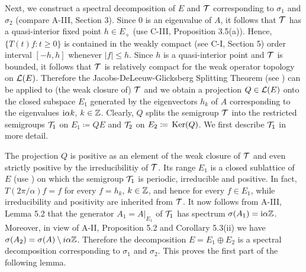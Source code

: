 Next, we construct a spectral decomposition of $E$ and $\mathcal{T}$ corresponding to $\sigma_{1}$ and $\sigma_{2}$ (compare A-III, Section 3).
Since $0$ is an eigenvalue of $A$, it follows that $\mathcal{T}$ has a quasi-interior fixed point $h \in E_{+}$ (use C-III, Proposition 3.5(a)).
Hence, $\{T(t)f : t \geq 0\}$ is contained in the weakly compact (see C-I, Section 5) order interval $[-h,h]$ whenever $|f| \leq h$.
Since $h$ is a quasi-interior point and $\mathcal{T}$ is bounded, it follows that $\mathcal{T}$ is relatively compact for the weak operator topology on $\mathcal{L}(E)$.
Therefore the Jacobs-DeLeeuw-Glicksberg Splitting Theorem (see \citet[Chapter 2, Theorem 4.4 and 4.5]{krengel:1985}) can be applied to (the weak closure of) $\mathcal{T}$ and we obtain a projection $Q \in \mathcal{L}(E)$ onto the closed subspace $E_{1}$ generated by the eigenvectors $h_{k}$ of $A$ corresponding to the eigenvalues $\mathrm{i}\alpha k$, $k \in \mathbb{Z}$.
Clearly, $Q$ splits the semigroup $\mathcal{T}$ into the restricted semigroups $\mathcal{T}_{1}$ on $E_{1} \coloneqq QE$ and $\mathcal{T}_{2}$ on $E_{2} \coloneqq \mathop{}\mathrm{Ker}(Q)$.
We first describe $\mathcal{T}_{1}$ in more detail.

The projection $Q$ is positive as an element of the weak closure of $\mathcal{T}$ and even strictly positive by the irreducibilitiy of $\mathcal{T}$.
Its range $E_{1}$ is a closed sublattice of $E$ (use \citet[Proposition III.11.5]{schaefer:1974}) on which the semigroup $\mathcal{T}_{1}$ is periodic, irreducible and positive.
In fact, $T(2\pi/\alpha)f = f$ for every $f = h_{k}$, $k \in \mathbb{Z}$, and hence for every $f \in E_{1}$, while irreducibility and positivity are inherited from $\mathcal{T}$.
It now follows from A-III, Lemma 5.2 that the generator $A_{1} = A|_{E_{1}}$ of $\mathcal{T}_{1}$ has spectrum $\sigma(A_{1}) = \mathrm{i}\alpha\mathbb{Z}$.
Moreover, in view of A-II, Proposition 5.2 and Corollary 5.3(ii) 
we have $\sigma(A_{2}) = \sigma(A) \setminus i\alpha\mathbb{Z}$.
Therefore the decomposition $E = E_{1} \oplus E_{2}$ is a spectral decomposition corresponding to $\sigma_{1}$ and $\sigma_{2}$.
This proves the first part of the following lemma.

